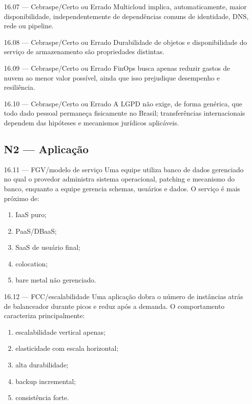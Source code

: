 \begin{questao}{ 16.07 — Cebraspe/Certo ou Errado}
Multicloud implica, automaticamente, maior disponibilidade, independentemente de dependências comuns de identidade, DNS, rede ou pipeline.
\end{questao}

\begin{questao}{ 16.08 — Cebraspe/Certo ou Errado}
Durabilidade de objetos e disponibilidade do serviço de armazenamento são propriedades distintas.
\end{questao}

\begin{questao}{ 16.09 — Cebraspe/Certo ou Errado}
FinOps busca apenas reduzir gastos de nuvem ao menor valor possível, ainda que isso prejudique desempenho e resiliência.
\end{questao}

\begin{questao}{ 16.10 — Cebraspe/Certo ou Errado}
A LGPD não exige, de forma genérica, que todo dado pessoal permaneça fisicamente no Brasil; transferências internacionais dependem das hipóteses e mecanismos jurídicos aplicáveis.
\end{questao}

\subsection*{N2 — Aplicação}

\begin{questao}{ 16.11 — FGV/modelo de serviço}
Uma equipe utiliza banco de dados gerenciado no qual o provedor administra sistema operacional, patching e mecanismo do banco, enquanto a equipe gerencia schemas, usuários e dados. O serviço é mais próximo de:
\begin{enumerate}[label=\Alph*)]
\item IaaS puro;
\item PaaS/DBaaS;
\item SaaS de usuário final;
\item colocation;
\item bare metal não gerenciado.
\end{enumerate}
\end{questao}

\begin{questao}{ 16.12 — FCC/escalabilidade}
Uma aplicação dobra o número de instâncias atrás de balanceador durante picos e reduz após a demanda. O comportamento caracteriza principalmente:
\begin{enumerate}[label=\Alph*)]
\item escalabilidade vertical apenas;
\item elasticidade com escala horizontal;
\item alta durabilidade;
\item backup incremental;
\item consistência forte.
\end{enumerate}
\end{questao}

